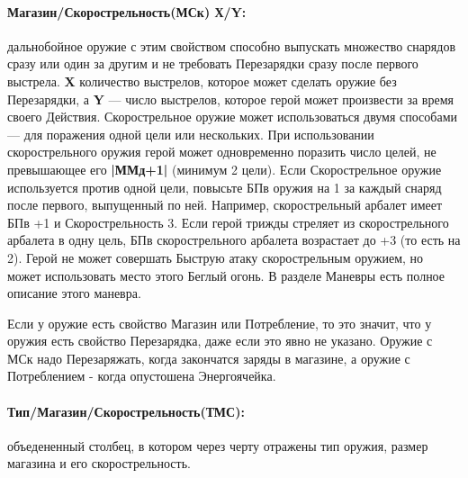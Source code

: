 \paragraph{Магазин/Скорострельность(МСк) Х/Y:} дальнобойное оружие с этим свойством способно выпускать множество снарядов сразу или один за другим и не требовать Перезарядки сразу после первого выстрела. \textbf{X} количество выстрелов, которое может сделать оружие без Перезарядки, а \textbf{Y} — число выстрелов, которое герой может произвести за время своего Действия. Скорострельное оружие может использоваться двумя способами — для поражения одной цели или нескольких. При использовании скорострельного оружия герой может одновременно поразить число целей, не превышающее его \textbf{|ММд+1|} (минимум 2 цели).
\newline
Если Скорострельное оружие используется против одной цели, повысьте БПв оружия на 1 за каждый снаряд после первого, выпущенный по ней. Например, скорострельный арбалет имеет БПв +1 и Скорострельность 3. Если герой трижды стреляет из скорострельного арбалета в одну цель, БПв скорострельного арбалета возрастает до +3 (то есть на 2).
Герой не может совершать Быструю атаку скорострельным оружием, но может использовать место этого Беглый огонь. В разделе Маневры есть полное описание этого маневра.
\begin{tcolorbox}
Если у оружие есть свойство Магазин или Потребление, то это значит, что у оружия есть свойство Перезарядка, даже если это явно не указано. Оружие с МСк надо Перезаряжать, когда закончатся заряды в магазине, а оружие с Потреблением - когда опустошена Энергоячейка.
\end{tcolorbox}
\paragraph{Тип/Магазин/Скорострельность(ТМС):} объедененный столбец, в котором через черту отражены тип оружия, размер магазина и его скорострельность.
